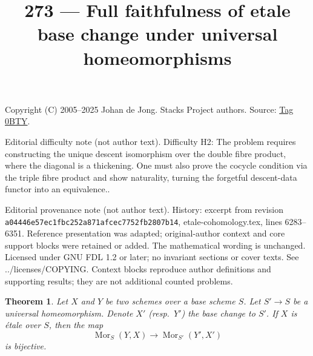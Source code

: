 \documentclass{amsart}
\theoremstyle{plain}
\newtheorem{theorem}[subsection]{Theorem}
\theoremstyle{definition}
\theoremstyle{remark}
\numberwithin{equation}{subsection}
\def\Mor{\mathop{\mathrm{Mor}}\nolimits}
\begin{document}
\title[Stacks Project, Tag 0BTY]{273 --- Full faithfulness of etale base change under universal homeomorphisms}
\maketitle
\noindent Copyright (C) 2005--2025 Johan de Jong. Stacks Project authors. Source: \href{https://stacks.math.columbia.edu/tag/0BTY}{Tag 0BTY}.

\noindent Editorial difficulty note (not author text). Difficulty H2: The problem requires constructing the unique descent isomorphism over the double fibre product, where the diagonal is a thickening. One must also prove the cocycle condition via the triple fibre product and show naturality, turning the forgetful descent-data functor into an equivalence..

\noindent Editorial provenance note (not author text). History: excerpt from revision \texttt{a0444\allowbreak 6e57e\allowbreak c1fbc\allowbreak 252a8\allowbreak 71afc\allowbreak ec775\allowbreak 2fb28\allowbreak 07b14}, etale-cohomology.tex, lines 6283--6351. Reference presentation was adapted; original-author context and core support blocks were retained or added. The mathematical wording is unchanged. Licensed under GNU FDL 1.2 or later; no invariant sections or cover texts. See ../licenses/COPYING. Context blocks reproduce author definitions and supporting results; they are not additional counted problems.

\begin{theorem}
\label{theorem-etale-topological}
Let $X$ and $Y$ be two schemes over a base scheme $S$. Let
$S' \to S$ be a universal homeomorphism.
Denote $X'$ (resp.\ $Y'$) the base change to $S'$.
If $X$ is \'etale over $S$, then the map
$$
\Mor_S(Y, X) \longrightarrow \Mor_{S'}(Y', X')
$$
is bijective.
\end{theorem}
\end{document}
